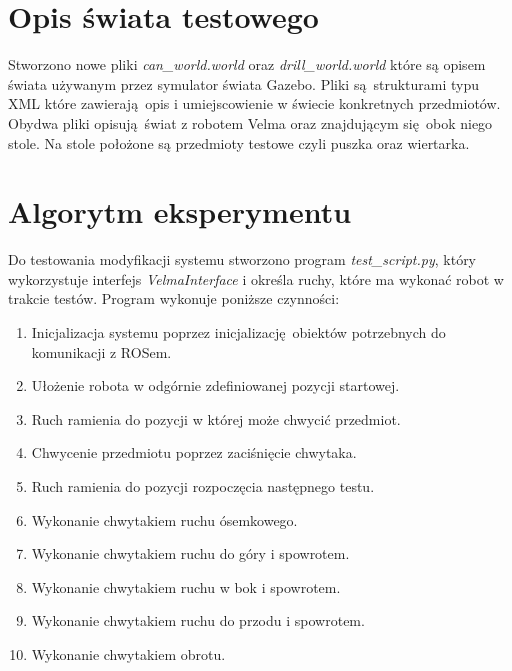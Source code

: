 \section{Opis świata testowego}
Stworzono nowe pliki \textit{can\_world.world} oraz \textit{drill\_world.world} które są opisem świata używanym przez symulator świata Gazebo. Pliki są strukturami typu XML które zawierają opis i umiejscowienie w świecie konkretnych przedmiotów. Obydwa pliki opisują świat z robotem Velma oraz znajdującym się obok niego stole. Na stole położone są przedmioty testowe czyli puszka oraz wiertarka.

\section{Algorytm eksperymentu}
Do testowania modyfikacji systemu stworzono program \textit{test\_script.py}, który wykorzystuje interfejs \textit{VelmaInterface} i określa ruchy, które ma wykonać robot w trakcie testów. Program wykonuje poniższe czynności:
\begin{enumerate}
	\item Inicjalizacja systemu poprzez inicjalizację obiektów potrzebnych do komunikacji z ROSem.
	\item Ułożenie robota w odgórnie zdefiniowanej pozycji startowej.
	\item Ruch ramienia do pozycji w której może chwycić przedmiot.
	\item Chwycenie przedmiotu poprzez zaciśnięcie chwytaka.
	\item Ruch ramienia do pozycji rozpoczęcia następnego testu.
	\item Wykonanie chwytakiem ruchu ósemkowego.
	\item Wykonanie chwytakiem ruchu do góry i spowrotem.
	\item Wykonanie chwytakiem ruchu w bok i spowrotem.
	\item Wykonanie chwytakiem ruchu do przodu i spowrotem.
	\item Wykonanie chwytakiem obrotu. 
\end{enumerate}
